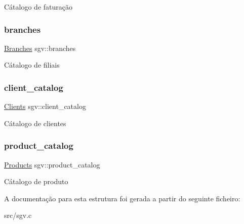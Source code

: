 Cátalogo de faturação \mbox{\label{structsgv_a655e9a2713e0baa6cfbaca8b84128616}} 
\subsubsection{\texorpdfstring{branches}{branches}}
{\footnotesize\ttfamily \hyperlink{structbranches}{Branches} sgv\+::branches}

Cátalogo de filiais \mbox{\label{structsgv_ac28c11a53701c92a0133867d5790d3ab}} 
\subsubsection{\texorpdfstring{client\+\_\+catalog}{client\_catalog}}
{\footnotesize\ttfamily \hyperlink{structclients}{Clients} sgv\+::client\+\_\+catalog}

Cátalogo de clientes \mbox{\label{structsgv_a614c60f5fb7c10e8e32928bba3b86277}} 
\subsubsection{\texorpdfstring{product\+\_\+catalog}{product\_catalog}}
{\footnotesize\ttfamily \hyperlink{structproducts}{Products} sgv\+::product\+\_\+catalog}

Cátalogo de produto 

A documentação para esta estrutura foi gerada a partir do seguinte ficheiro\+:\begin{DoxyCompactItemize}
\item 
src/sgv.\+c\end{DoxyCompactItemize}
